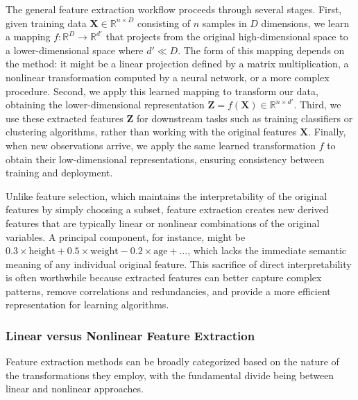 The general feature extraction workflow proceeds through several stages. First, given training data $\mathbf{X} \in \mathbb{R}^{n \times D}$ consisting of $n$ samples in $D$ dimensions, we learn a mapping $f: \mathbb{R}^D \to \mathbb{R}^{d'}$ that projects from the original high-dimensional space to a lower-dimensional space where $d' \ll D$. The form of this mapping depends on the method: it might be a linear projection defined by a matrix multiplication, a nonlinear transformation computed by a neural network, or a more complex procedure. Second, we apply this learned mapping to transform our data, obtaining the lower-dimensional representation $\mathbf{Z} = f(\mathbf{X}) \in \mathbb{R}^{n \times d'}$. Third, we use these extracted features $\mathbf{Z}$ for downstream tasks such as training classifiers or clustering algorithms, rather than working with the original features $\mathbf{X}$. Finally, when new observations arrive, we apply the same learned transformation $f$ to obtain their low-dimensional representations, ensuring consistency between training and deployment.

Unlike feature selection, which maintains the interpretability of the original features by simply choosing a subset, feature extraction creates new derived features that are typically linear or nonlinear combinations of the original variables. A principal component, for instance, might be $0.3 \times \text{height} + 0.5 \times \text{weight} - 0.2 \times \text{age} + \ldots$, which lacks the immediate semantic meaning of any individual original feature. This sacrifice of direct interpretability is often worthwhile because extracted features can better capture complex patterns, remove correlations and redundancies, and provide a more efficient representation for learning algorithms.

\subsubsection*{Linear versus Nonlinear Feature Extraction}

Feature extraction methods can be broadly categorized based on the nature of the transformations they employ, with the fundamental divide being between linear and nonlinear approaches.

